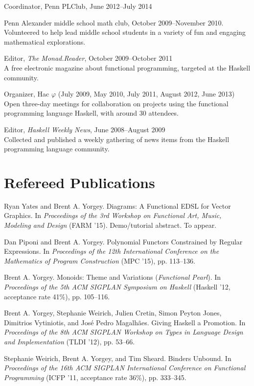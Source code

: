 \documentclass[12pt]{article}
\newcommand{\cvitem}{\par\hangpara{2em}{1}}
\begin{document}
\cvitem Coordinator, Penn PLClub, June 2012--July 2014

\cvitem Penn Alexander middle school math club, October 2009--November
2010. \\
Volunteered to help lead middle school students in a variety of fun
and engaging mathematical explorations.

\cvitem Editor, \emph{The Monad.Reader}, October 2009--October 2011 \\
A free electronic magazine about functional programming, targeted at
the Haskell community.

\cvitem Organizer, Hac $\varphi$ (July 2009, May 2010, July 2011,
August 2012, June 2013) \\
Open three-day meetings for collaboration on projects using the functional
programming language Haskell, with around 30 attendees.

\cvitem Editor, \emph{Haskell Weekly News}, June 2008--August 2009 \\
Collected and published a weekly gathering of news items from the
Haskell programming language community.

\section*{Refereed Publications}

\cvitem Ryan Yates and Brent A. Yorgey. Diagrams: A Functional EDSL
for Vector Graphics. In \emph{Proceedings of the 3rd Workshop on
  Functional Art, Music, Modeling and Design} (FARM '15).
  Demo/tutorial abstract.  To appear.

\cvitem Dan Piponi and Brent A. Yorgey.  Polynomial Functors
Constrained by Regular Expressions.  In \emph{Proceedings of the 12th
  International Conference on the Mathematics of Program Construction}
(MPC '15), pp. 113--136.

\cvitem Brent A. Yorgey. Monoids: Theme and Variations
(\emph{Functional Pearl}).  In \emph{Proceedings of the 5th ACM
  SIGPLAN Symposium on Haskell} (Haskell '12, acceptance rate 41\%),
pp. 105--116.

\cvitem Brent A. Yorgey, Stephanie Weirich, Julien Cretin, Simon
Peyton Jones, Dimitrios Vytiniotis, and Jos\'e Pedro
Magalh\~aes. Giving Haskell a Promotion. In \emph{Proceedings of the
  8th ACM SIGPLAN Workshop on Types in Language Design and
  Implementation} (TLDI '12), pp. 53--66.

\cvitem Stephanie Weirich, Brent A. Yorgey, and Tim Sheard. Binders
Unbound. In \emph{Proceedings of the 16th ACM SIGPLAN International
  Conference on Functional Programming} (ICFP '11, acceptance rate
  36\%), pp. 333--345.
\end{document}

